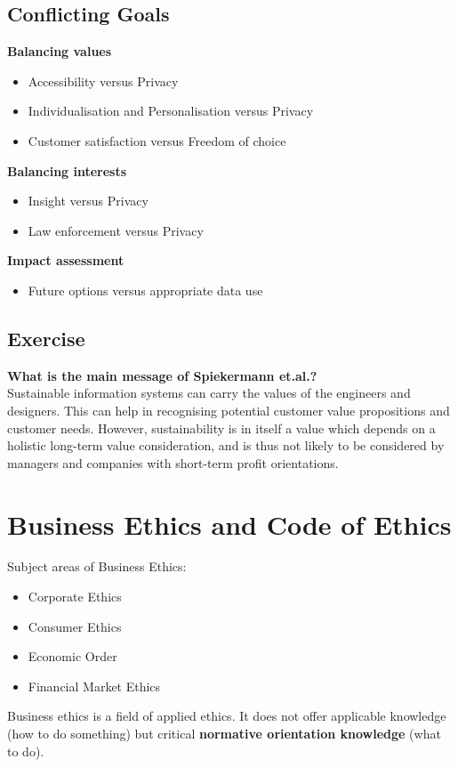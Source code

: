 \documentclass[11pt]{article}
\theoremstyle{definition}
\begin{document}
\subsection{Conflicting Goals}
\textbf{Balancing values}
\begin{itemize}[label=-]
	\item Accessibility versus Privacy
	\item Individualisation and Personalisation versus Privacy
	\item Customer satisfaction versus Freedom of choice
\end{itemize}
\textbf{Balancing interests}
\begin{itemize}[label=-]
	\item Insight versus Privacy
	\item Law enforcement versus Privacy
\end{itemize}
\textbf{Impact assessment}
\begin{itemize}[label=-]
	\item Future options versus appropriate data use
\end{itemize}

\subsection{Exercise}
\textbf{What is the main message of Spiekermann et.al.?}\\
Sustainable information systems can carry the values of the engineers and designers. This can help in recognising potential customer value propositions and customer needs. However, sustainability is in itself a value which depends on a holistic long-term value consideration, and is thus not likely to be considered by managers and companies with short-term profit orientations.

\clearpage
\section{Business Ethics and Code of Ethics}
Subject areas of Business Ethics:
\begin{itemize}
	\item Corporate Ethics
	\item Consumer Ethics
	\item Economic Order
	\item Financial Market Ethics
\end{itemize}
\begin{definition}
	Business ethics is a field of applied ethics. It does not offer applicable knowledge (how to do something) but critical \textbf{normative orientation knowledge} (what to do).
\end{definition}
\end{document}
